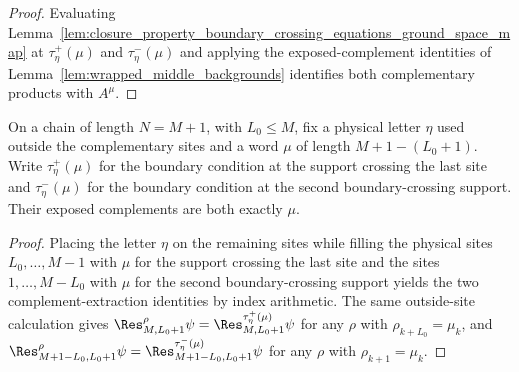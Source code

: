 \begin{proof}
    \leanok
    Evaluating
    Lemma~\ref{lem:closure_property_boundary_crossing_equations_ground_space_map}
    at $\tau^+_\eta(\mu)$ and $\tau^-_\eta(\mu)$ and applying the
    exposed-complement identities of Lemma~\ref{lem:wrapped_middle_backgrounds}
    identifies both complementary products with $A^\mu$.
\end{proof}

\begin{lemma}%
    \label{lem:wrapped_middle_backgrounds}
    \leanok
    On a chain of length $N=M+1$, with $L_0\le M$, fix a physical letter $\eta$
    used outside the complementary sites and a word $\mu$ of length
    $M+1-(L_0+1)$. Write $\tau^+_\eta(\mu)$ for the boundary condition at the
    support crossing the last site and $\tau^-_\eta(\mu)$ for the boundary
    condition at the second boundary-crossing support. Their exposed
    complements are both exactly $\mu$.
\end{lemma}

\begin{proof}
    \leanok
    Placing the letter $\eta$ on the remaining sites while filling the physical
    sites $L_0,\ldots,M-1$ with $\mu$ for the support crossing the last site
    and the sites $1,\ldots,M-L_0$ with $\mu$ for the second boundary-crossing
    support yields the two complement-extraction identities by index
    arithmetic. The same outside-site calculation gives
    $\Res^\rho_{M,L_0+1}\psi
        =\Res^{\tau^+_\eta(\mu)}_{M,L_0+1}\psi$ for any $\rho$ with
    $\rho_{k+L_0}=\mu_k$, and
    $\Res^\rho_{M+1-L_0,L_0+1}\psi
        =\Res^{\tau^-_\eta(\mu)}_{M+1-L_0,L_0+1}\psi$ for any $\rho$ with
    $\rho_{k+1}=\mu_k$.
\end{proof}

